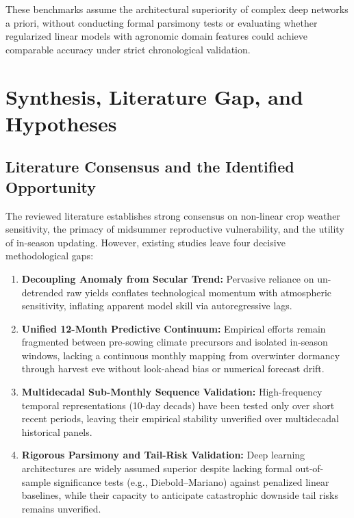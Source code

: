 These benchmarks assume the architectural superiority of complex deep networks a priori, without conducting formal parsimony tests or evaluating whether regularized linear models with agronomic domain features could achieve comparable accuracy under strict chronological validation.

\section{Synthesis, Literature Gap, and Hypotheses}
\label{sec:lit_synthesis_gap}

\subsection{Literature Consensus and the Identified Opportunity}
The reviewed literature establishes strong consensus on non-linear crop weather sensitivity, the primacy of midsummer reproductive vulnerability, and the utility of in-season updating. However, existing studies leave four decisive methodological gaps:
\begin{enumerate}
    \item \textbf{Decoupling Anomaly from Secular Trend:} Pervasive reliance on un-detrended raw yields conflates technological momentum with atmospheric sensitivity, inflating apparent model skill via autoregressive lags.
    \item \textbf{Unified 12-Month Predictive Continuum:} Empirical efforts remain fragmented between pre-sowing climate precursors and isolated in-season windows, lacking a continuous monthly mapping from overwinter dormancy through harvest eve without look-ahead bias or numerical forecast drift.
    \item \textbf{Multidecadal Sub-Monthly Sequence Validation:} High-frequency temporal representations (10-day decads) have been tested only over short recent periods, leaving their empirical stability unverified over multidecadal historical panels.
    \item \textbf{Rigorous Parsimony and Tail-Risk Validation:} Deep learning architectures are widely assumed superior despite lacking formal out-of-sample significance tests (e.g., Diebold--Mariano) against penalized linear baselines, while their capacity to anticipate catastrophic downside tail risks remains unverified.
\end{enumerate}

